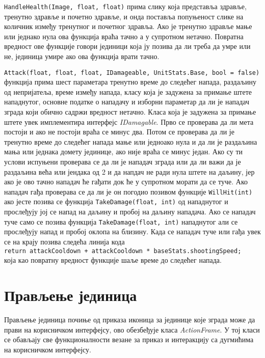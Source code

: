 \documentclass[11pt,a4paper]{article}
\begin{document}
\texttt{HandleHealth(Image, float, float)} прима слику која представља здравље, тренутно здравље и почетно здравље, и онда поставља попуњеност слике на количник између тренутног и почетног здравља. Ако је тренутно здравље мање или једнако нула ова функција враћа тачно а у супротном нетачно. Повратна вредност ове функције говори јединици која ју позива да ли треба да умре или не, јединица умире ако ова функција врати тачно.

\texttt{Attack(float, float, float, IDamageable, UnitStats.Base, bool = false)} функција прима шест параметара тренутно време до следећег напада, раздаљину од непријатеља, време између напада, класу која је задужена за примање штете нападнутог, основне податке о нападачу и изборни параметар да ли је нападач зграда који обично садржи вредност нетачно. Класа која је задужена за примање штете увек имплементира интерфејс \emph{IDamagable}. Прво се проверава да ли мета постоји и ако не постоји враћа се минус два.
Потом се проверава да ли је  тренутно време до следећег напада мање или једноако нула и да ли је раздаљина мања или једнака домету јединице, ако није враћа се минус један.
Ако су ти услови испуњени проверава се да ли је нападач зграда или да ли важи да је раздаљина већа или јендака од 2 и да напдач не ради нула штете на даљину, јер ако је ово тачно нападач ће гађати док ће у супротном морати да се туче. Ако нападач гађа проверава се да ли је он погодио позивом функције \texttt{WillHit(int)} ако јесте позива се функција 
\texttt{TakeDamage(float, int)} од нападнутог и прослеђују јој се напад на даљину и пробој на даљину нападача. Ако се нападач туче само се позива функција \texttt{TakeDamage(float, int)} нападнутог али се прослеђују напад и пробој оклопа на близину. Када се нападач туче или гађа увек се на крају позива следећа линија кода\\ \texttt{return attackCooldown + attackCooldown * baseStats.shootingSpeed;}\\ 
која као повратну вредност функције шаље време до следећег напада. 
 

\section{Прављење јединица} \label{прављењеЈединица}
Прављење јединица почиње од приказа иконица за јединице које зграда може да прави на корисничком интерфејсу, ово обезбеђује класа \emph{ActionFrame}. У тој класи се обављају све функционалности везане за приказ и интеракцију са дугмићима на корисничком интерфејсу.
\end{document}
